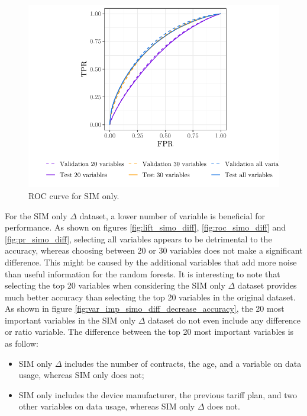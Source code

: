 \begin{figure}
    \centering
    \includegraphics[width=0.9\linewidth]{figures/roc_simo.pdf}
    \caption{ROC curve for SIM only.}
    \label{fig:roc_simo}
\end{figure}

For the SIM only $\Delta$ dataset, a lower number of variable is beneficial for
performance. As shown on figures \ref{fig:lift_simo_diff},
\ref{fig:roc_simo_diff} and \ref{fig:pr_simo_diff}, selecting all variables
appears to be detrimental to the accuracy, whereas choosing between 20 or 30
variables does not make a significant difference. This might be caused by the
additional variables that add more noise than useful information for the random
forests. It is interesting to note that selecting the top 20 variables when
considering the SIM only $\Delta$ dataset provides much better accuracy than
selecting the top 20 variables in the original dataset. As shown in figure
\ref{fig:var_imp_simo_diff_decrease_accuracy}, the 20 most important variables
in the SIM only $\Delta$ dataset do not even include any difference or ratio
variable. The difference between the top 20 most important variables is as
follow:

\begin{itemize}
    \item SIM only $\Delta$ includes the number of contracts, the age, and a
    variable on data usage, whereas SIM only does not;
    \item SIM only includes the device manufacturer, the previous tariff plan,
    and two other variables on data usage, whereas SIM only $\Delta$ does not.
\end{itemize}

